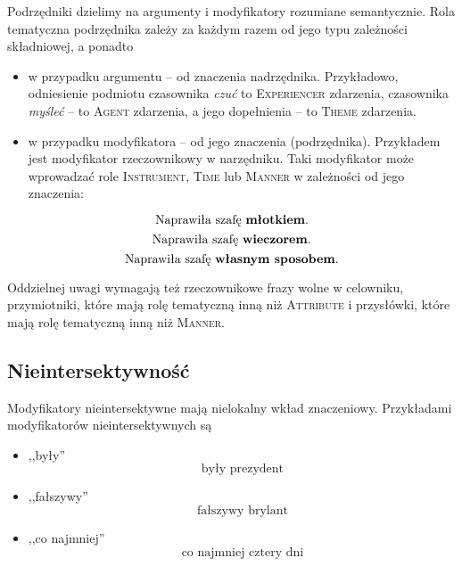 \documentclass[a4paper, 12pt]{article}
\theoremstyle{remark}
\newcommand{\experiencer}{\textsc{Experiencer}}
\newcommand{\agent}{\textsc{Agent}}
\newcommand{\theme}{\textsc{Theme}}
\begin{document}
Podrzędniki dzielimy na argumenty i modyfikatory rozumiane semantycznie. Rola tematyczna podrzędnika zależy za każdym razem od 
jego typu zależności składniowej, a ponadto
\begin{itemize}
	\item w przypadku argumentu -- od znaczenia nadrzędnika.
Przykładowo, odniesienie podmiotu czasownika \emph{czuć} to \experiencer{} zdarzenia, czasownika \emph{myśleć} -- to \agent{} zdarzenia, a jego dopełnienia -- to \theme{} zdarzenia.
\item w przypadku modyfikatora -- od jego znaczenia (podrzędnika).
Przykładem jest modyfikator rzeczownikowy w narzędniku. Taki modyfikator może wprowadzać role \textsc{Instrument}, \textsc{Time} lub \textsc{Manner} w zależności od jego znaczenia:
\end{itemize}
\begin{equation}
	\text{Naprawiła szafę \textbf{młotkiem}.} 
\end{equation}
\begin{equation}
	\text{Naprawiła szafę \textbf{wieczorem}.} 
\end{equation}
\begin{equation}
	\text{Naprawiła szafę \textbf{własnym sposobem}.} 
\end{equation}

Oddzielnej uwagi wymagają też rzeczownikowe frazy wolne w celowniku,
przymiotniki, które mają rolę tematyczną inną niż \textsc{Attribute}
i przysłówki, które mają rolę tematyczną inną niż \textsc{Manner}.

\subsection{Nieintersektywność}

Modyfikatory nieintersektywne mają nielokalny wkład znaczeniowy. Przykładami modyfikatorów nieintersektywnych są
\begin{itemize}
\item ,,były''
\begin{equation}
	\text{były prezydent}
\end{equation}
\item ,,fałszywy''
\begin{equation}
	\text{fałszywy brylant}
\end{equation}
\item ,,co najmniej''
\begin{equation}
	\text{co najmniej cztery dni}
\end{equation}
\end{itemize}
\end{document}
